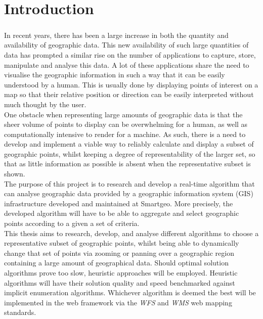 \chapter{Introduction}
\label{chap:intro}
\paragraph{}
In recent years, there has been a large increase in both the quantity and availability of geographic data. This new availability of such large quantities of data has prompted a similar rise on the number of applications to capture, store, manipulate and analyse this data.
A lot of these applications share the need to visualise the geographic information in such a way that it can be easily understood by a human.
This is usually done by displaying points of interest on a map so that their relative position or direction can be easily interpreted without much thought by the user.
\\
One obstacle when representing large amounts of geographic data is that the sheer volume of points to display can be overwhelming for a human, as well as computationally intensive to render for a machine. As such, there is a need to develop and implement a viable way to reliably calculate and display a subset of geographic points, whilst keeping a degree of representability of the larger set, so that as little information as possible is absent when the representative subset is shown.
\\
The purpose of this project is to research and develop a real-time algorithm that can analyse geographic data provided by a geographic information system (GIS) infrastructure developed and maintained at Smartgeo. More precisely, the developed algorithm will have to be able to aggregate and select geographic points according to a given a set of criteria.
\\
This thesis aims to research, develop, and analyse different algorithms to choose a representative subset of geographic points, whilst being able to dynamically change that set of points via zooming or panning over a geographic region containing a large amount of geographical data. Should optimal solution algorithms prove too slow, heuristic approaches will be employed. Heuristic algorithms will have their solution quality and speed benchmarked against implicit enumeration algorithms.
Whichever algorithm is deemed the best will be implemented in the web framework via the \emph{WFS} and \emph{WMS} web mapping standards.
